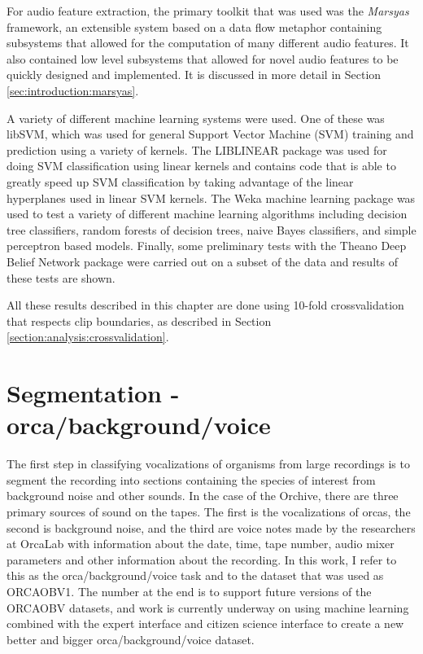 For audio feature extraction, the primary toolkit that was used was
the \textit{Marsyas} \cite{tzanetakis2008marsyas} framework, an extensible
system based on a data flow metaphor containing subsystems that
allowed for the computation of many different audio features.  It also
contained low level subsystems that allowed for novel audio features
to be quickly designed and implemented.  It is discussed in more
detail in Section \ref{sec:introduction:marsyas}.

A variety of different machine learning systems were used.  One of
these was libSVM\cite{chang2001libsvm}, which was used for general
Support Vector Machine (SVM) training and prediction using a variety
of kernels.  The LIBLINEAR \cite{rongen2008liblinear} package was used
for doing SVM classification using linear kernels and contains code
that is able to greatly speed up SVM classification by taking
advantage of the linear hyperplanes used in linear SVM kernels.  The
Weka machine learning package \cite{witten2005weka} was used to test a
variety of different machine learning algorithms including decision
tree classifiers, random forests of decision trees, naive Bayes
classifiers, and simple perceptron based models.  Finally, some
preliminary tests with the Theano \cite{bergstra2010theano} Deep
Belief Network package were carried out on a subset of the data and
results of these tests are shown.

All these results described in this chapter are done using 10-fold
crossvalidation that respects clip boundaries, as described in Section
\ref{section:analysis:crossvalidation}.

\section{Segmentation - orca/background/voice}

The first step in classifying vocalizations of organisms from large
recordings is to segment the recording into sections containing the
species of interest from background noise and other sounds.  In the
case of the Orchive, there are three primary sources of sound on the
tapes.  The first is the vocalizations of orcas, the second is
background noise, and the third are voice notes made by the
researchers at OrcaLab with information about the date, time, tape
number, audio mixer parameters and other information about the
recording.  In this work, I refer to this as the
orca/background/voice task and to the dataset that was used as
ORCAOBV1.  The number at the end is to support future versions of the
ORCAOBV datasets, and work is currently underway on using machine
learning combined with the expert interface and citizen science
interface to create a new better and bigger orca/background/voice
dataset.


